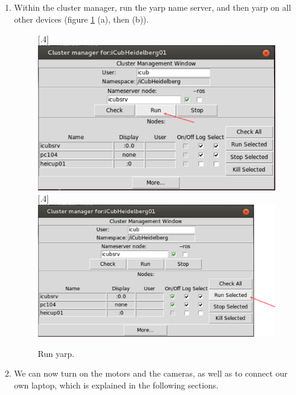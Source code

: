 \begin{enumerate}
	\newline {}
	\item Within the cluster manager, run the yarp name server, and then yarp on all other devices (figure \ref{fig::B1_cluster} (a), then (b)).
	\begin{figure}[h!]
		\centering
		[.4\linewidth]{\includegraphics[scale=.3]{chapters/06_appendix/img/ran_yarp.png}}
		[.4\linewidth]{\includegraphics[scale=.3]{chapters/06_appendix/img/ran_yarp_others.png}}
		\caption{Run yarp.}
		\label{fig::B1_cluster}
	\end{figure}
	\item We can now turn on the motors and the cameras, as well as to connect our own laptop, which is explained in the following sections.
\end{enumerate}
\FloatBarrier
